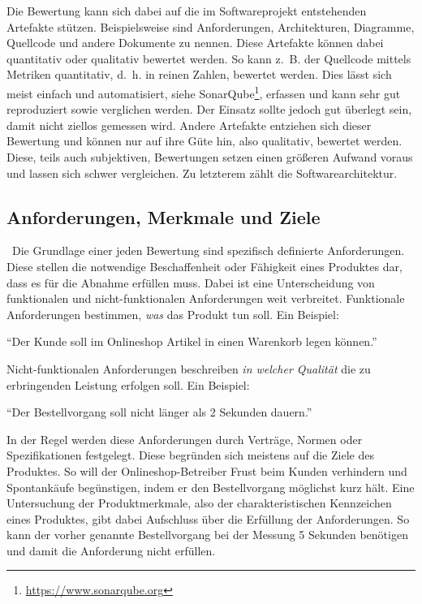 
Die Bewertung kann sich dabei auf die im Softwareprojekt entstehenden Artefakte stützen. Beispielsweise sind
Anforderungen, Architekturen, Diagramme, Quellcode und andere Dokumente zu nennen. Diese Artefakte können dabei quantitativ 
oder qualitativ bewertet werden. So kann z.~B. der Quellcode mittels Metriken quantitativ, d.~h. in reinen Zahlen, bewertet werden. Dies lässt sich meist einfach und automatisiert, siehe SonarQube\footnote{\url{https://www.sonarqube.org}}, erfassen und kann sehr gut reproduziert sowie verglichen werden. Der Einsatz sollte jedoch gut überlegt sein, damit nicht ziellos gemessen wird.
Andere Artefakte entziehen sich dieser Bewertung und können nur auf ihre Güte hin, also qualitativ, bewertet werden. Diese, teils auch subjektiven, Bewertungen setzen einen größeren Aufwand voraus und lassen sich schwer vergleichen.  
Zu letzterem zählt die Softwarearchitektur. 

\subsection{Anforderungen, Merkmale und Ziele}
\
Die Grundlage einer jeden Bewertung sind spezifisch definierte Anforderungen. Diese stellen die notwendige Beschaffenheit oder Fähigkeit eines Produktes dar, dass es für die Abnahme erfüllen muss. Dabei ist eine Unterscheidung von funktionalen und nicht-funktionalen Anforderungen weit verbreitet. Funktionale Anforderungen bestimmen, \textit{was} das Produkt tun soll\cite{Robertson2006}. Ein Beispiel:

\enquote{Der Kunde soll im Onlineshop Artikel in einen Warenkorb legen können.}

Nicht-funktionalen Anforderungen beschreiben \textit{in welcher Qualität} die zu erbringenden Leistung erfolgen soll\cite{Robertson2006}. Ein Beispiel:

\enquote{Der Bestellvorgang soll nicht länger als 2 Sekunden dauern.}

In der Regel werden diese Anforderungen durch Verträge, Normen oder Spezifikationen festgelegt. Diese begründen sich meistens auf die Ziele des Produktes. So will der Onlineshop-Betreiber Frust beim Kunden verhindern und Spontankäufe begünstigen, indem er den Bestellvorgang möglichst kurz hält.
Eine Untersuchung der Produktmerkmale, also der charakteristischen Kennzeichen eines Produktes, gibt dabei Aufschluss über die Erfüllung der Anforderungen. So kann der vorher genannte Bestellvorgang bei der Messung 5 Sekunden benötigen und damit die Anforderung nicht erfüllen.      

